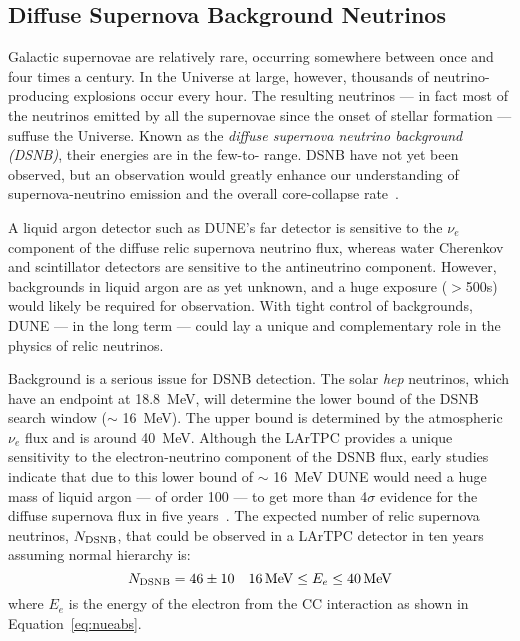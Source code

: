\subsection{Diffuse Supernova Background Neutrinos}

Galactic supernovae are relatively rare, occurring somewhere between
once and four times a century. In the Universe
at large, however, thousands of neutrino-producing explosions occur
every hour.  The resulting neutrinos --- in fact most of the neutrinos
emitted by all the supernovae since the onset of stellar formation ---
suffuse the Universe.  Known as the \emph{diffuse supernova neutrino background
  (DSNB)}, their energies are in the few-to- range.  DSNB
have not yet been observed, but an observation would greatly enhance
our understanding of supernova-neutrino emission and the overall
core-collapse rate~\cite{Beacom:2010kk}.


A liquid argon detector such as DUNE's far detector is sensitive to
the $\nu_e$ component of the diffuse relic supernova neutrino flux,
whereas water Cherenkov and scintillator detectors are sensitive to
the antineutrino component.  However, backgrounds in liquid argon are as
yet unknown, and a huge exposure ($>$\SI{500}{\ktyr}s)
would likely be required for observation.  
With tight control of
backgrounds, 
DUNE --- in the long term --- could 
lay a unique and
 complementary role in the physics of relic neutrinos.


Background is a serious issue for DSNB detection.
The solar {\em hep} neutrinos, which have an                
endpoint at \SI{18.8}{\MeV}, will determine the lower bound of the DSNB
search window ($\sim$ \SI{16}{\MeV}).  The upper bound is determined
by the atmospheric ${\nu}_{e}$ flux and
is around \SI{40}{MeV}.
Although the LArTPC provides a unique sensitivity to the
electron-neutrino component of the DSNB flux, early studies indicate
that due to this lower bound of $\sim$ \SI{16}{\MeV} DUNE would need a huge
mass of liquid argon --- of order \SI{100}{\kt} --- to get more than 4$\sigma$
evidence for the diffuse supernova flux in five
years~\cite{Cocco:2004ac}.
%
The expected number of relic
supernova neutrinos, $N_{\rm DSNB}$, that could be observed in a
 LArTPC detector in ten years~\cite{Cocco:2004ac}
assuming normal hierarchy is:
\begin{equation}
N_{\rm DSNB} = 46 \pm 10  \ \ \ 16 \, {\rm MeV} \leq E_e \leq 40 \, {\rm MeV}
\label{eqn:srnrate}
\end{equation}
where $E_e$ is the energy of the electron from the CC interaction as
shown in Equation~\ref{eq:nueabs}. 

